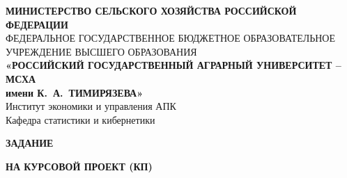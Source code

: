 \documentclass[a4paper,14pt]{extreport}
\begin{document}
\setcounter{page}{2}

\thispagestyle{empty}
\begin{center}
  \fontsize{11pt}{13pt}\selectfont
  \textbf{МИНИСТЕРСТВО СЕЛЬСКОГО ХОЗЯЙСТВА РОССИЙСКОЙ ФЕДЕРАЦИИ}\\
  \vspace{1mm}
  ФЕДЕРАЛЬНОЕ ГОСУДАРСТВЕННОЕ БЮДЖЕТНОЕ ОБРАЗОВАТЕЛЬНОЕ УЧРЕЖДЕНИЕ ВЫСШЕГО ОБРАЗОВАНИЯ\\
  \textbf{«РОССИЙСКИЙ ГОСУДАРСТВЕННЫЙ АГРАРНЫЙ УНИВЕРСИТЕТ -- МСХА}\\
  \textbf{имени К.~А.~ТИМИРЯЗЕВА»}\\
  \vspace{1mm}
  Институт экономики и управления АПК\\
  Кафедра статистики и кибернетики\\[3mm]
  {\fontsize{13pt}{16pt}\selectfont\bfseries ЗАДАНИЕ\par}
  \vspace{0.5mm}
  {\fontsize{13pt}{16pt}\selectfont\bfseries НА КУРСОВОЙ ПРОЕКТ (КП)\par}
\end{center}
\end{document}
